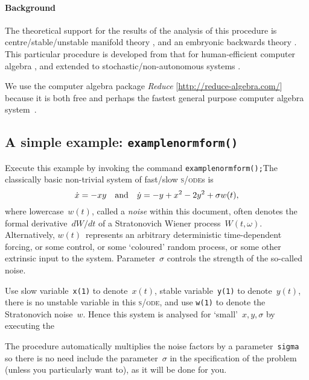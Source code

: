 \documentclass[11pt,a5paper]{article}
\def\sde{\textsc{s/ode}}
\begin{document}
\paragraph{Background}
The theoretical support for the results of the analysis of
this procedure is centre\slash stable\slash unstable
manifold theory \cite[e.g.,][]{Carr81, Knobloch82, Haragus2011,
Roberts2014a}, and an embryonic backwards theory
\cite[]{Roberts2018a}. 
This particular procedure is developed from that for human-efficient computer
algebra \cite[]{Roberts96a}, and extended to stochastic\slash non-autonomous systems \cite[]{Chao95, Roberts06k}.

We use the computer algebra package \emph{Reduce} 
[\url{http://reduce-algebra.com/}] because it is both free 
and perhaps the fastest general purpose computer algebra 
system~\cite[e.g.]{Fateman2002}.



\subsection{A simple example: \texttt{examplenormform()}} 
\label{ss:eg}
Execute this example by invoking the command
\verb|examplenormform();|\quad The classically basic non-trivial system of fast/slow \sde{}s \cite[\S19.1]{Roberts2014a} is
\begin{equation*}
\dot x=-xy \quad\mbox{and}\quad \dot y=-y+x^2-2y^2+\sigma w(t),
\end{equation*}
where lowercase~$w(t)$, called a \emph{noise} within this document,  often denotes the formal derivative~$dW/dt$ of a Stratonovich Wiener process~$W(t,\omega)$.
Alternatively, \(w(t)\)~represents an arbitrary deterministic time-dependent forcing, or some control, or some `coloured' random process, or some other extrinsic input to the system.
Parameter~$\sigma$ controls the strength of the so-called noise.

Use slow variable~\verb|x(1)| to denote~$x(t)$, stable variable~\verb|y(1)| to denote~$y(t)$, there is no unstable variable in this \sde, and use \verb|w(1)| to denote the Stratonovich noise~$w$.
Hence this system is analysed for `small'~\(x,y,\sigma\) by executing the 
The procedure automatically multiplies the noise factors by a parameter~\verb|sigma| so there is no need include the parameter~$\sigma$ in the specification of the problem (unless you particularly want to), as it will be done for you.
\end{document}
